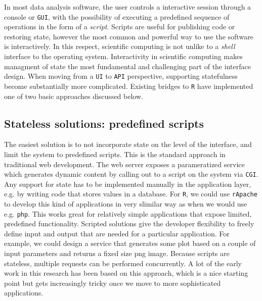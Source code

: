 \documentclass{article}
\newcommand{\CGI}{\texttt{CGI}\xspace}
\newcommand{\R}{\texttt{R}\xspace}
\newcommand{\HTTP}{\texttt{HTTP}\xspace}
\newcommand{\TCP}{\texttt{TCP}\xspace}
\newcommand{\IP}{\texttt{IP}\xspace}
\newcommand{\GUI}{\texttt{GUI}\xspace}
\newcommand{\UI}{\texttt{UI}\xspace}
\newcommand{\API}{\texttt{API}\xspace}
\begin{document}

In most data analysis software, the user controls a interactive session through a console or \GUI, with the possibility of executing a predefined sequence of operations in the form of a \emph{script}. Scripts are useful for publishing code or restoring state, however the most common and powerful way to use the software is interactively. In this respect, scientific computing is not unlike to a \emph{shell} interface to the operating system. Interactivity in scientific computing makes managment of state the most fundamental and challenging part of the interface design. When moving from a \UI to \API perspective, supporting statefulness become substantially more complicated. Existing bridges to \R have implemented one of two basic approaches discussed below. 

\subsection{Stateless solutions: predefined scripts}

The easiest solution is to not incorporate state on the level of the interface, and limit the system to predefined scripts. This is the standard approach in traditional web development. The web server exposes a parameratized service which generates dynamic content by calling out to a script on the system via \CGI. Any support for state has to be implemented manually in the application layer, e.g. by writing code that stores values in a database. For \R, we could use \texttt{rApache} \citep{horner2013rapache} to develop this kind of applications in very slimilar way as when we would use e.g. \texttt{php}. This works great for relatively simple applications that expose limited, predefined functionality. Scripted solutions give the developer flexibility to freely define input and output that are needed for a particular application. For example, we could design a service that generates some plot based on a couple of input parameters and returns a fixed size png image. Because scripts are stateless, multiple requests can be performed concurrently. A lot of the early work in this research has been based on this approach, which is a nice starting point but gets increasingly tricky once we move to more sophisticated applications.
\end{document}
